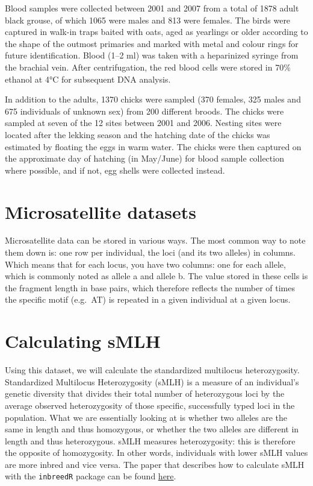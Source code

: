 \documentclass[
  letterpaper,
  DIV=11,
  numbers=noendperiod]{scrreprt}
\begin{document}
Blood samples were collected between 2001 and 2007 from a total of 1878
adult black grouse, of which 1065 were males and 813 were females. The
birds were captured in walk-in traps baited with oats, aged as yearlings
or older according to the shape of the outmost primaries and marked with
metal and colour rings for future identification. Blood (1--2 ml) was
taken with a heparinized syringe from the brachial vein. After
centrifugation, the red blood cells were stored in 70\% ethanol at 4°C
for subsequent DNA analysis.

In addition to the adults, 1370 chicks were sampled (370 females, 325
males and 675 individuals of unknown sex) from 200 different broods. The
chicks were sampled at seven of the 12 sites between 2001 and 2006.
Nesting sites were located after the lekking season and the hatching
date of the chicks was estimated by floating the eggs in warm water. The
chicks were then captured on the approximate day of hatching (in
May/June) for blood sample collection where possible, and if not, egg
shells were collected instead.

\section{Microsatellite datasets}\label{microsatellite-datasets}

Microsatellite data can be stored in various ways. The most common way
to note them down is: one row per individual, the loci (and its two
alleles) in columns. Which means that for each locus, you have two
columns: one for each allele, which is commonly noted as allele a and
allele b. The value stored in these cells is the fragment length in base
pairs, which therefore reflects the number of times the specific motif
(e.g.~AT) is repeated in a given individual at a given locus.

\section{Calculating sMLH}\label{calculating-smlh}

Using this dataset, we will calculate the standardized multilocus
heterozygosity. Standardized Multilocus Heterozygosity (sMLH) is a
measure of an individual's genetic diversity that divides their total
number of heterozygous loci by the average observed heterozygosity of
those specific, successfully typed loci in the population. What we are
essentially looking at is whether two alleles are the same in length and
thus homozygous, or whether the two alleles are different in length and
thus heterozygous. sMLH measures heterozygosity: this is therefore the
opposite of homozygosity. In other words, individuals with lower sMLH
values are more inbred and vice versa. The paper that describes how to
calculate sMLH with the \texttt{inbreedR} package can be found
\href{https://besjournals.onlinelibrary.wiley.com/doi/full/10.1111/2041-210X.12588}{here}.
\end{document}

